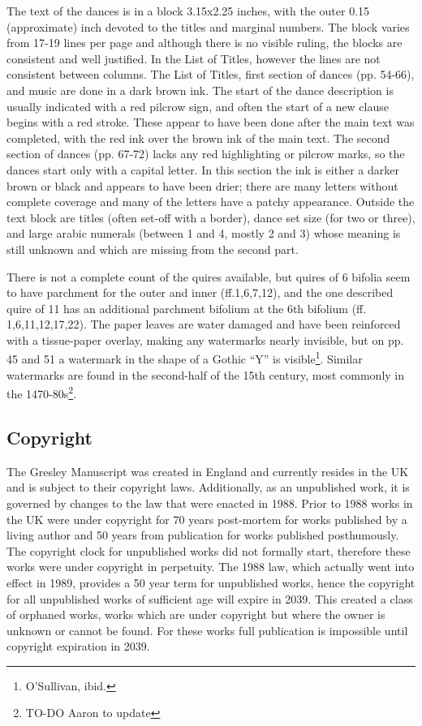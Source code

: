 \documentclass[12pt,letter]{article} %
\begin{document}
The text of the dances is in a block 3.15x2.25 inches, with the outer 0.15 (approximate) inch devoted to the titles and marginal numbers.  The block varies from 17-19 lines per page and although there is no visible ruling, the blocks are consistent and well justified.  In the List of Titles, however the lines are not consistent between columns.   The List of Titles, first section of dances (pp. 54-66), and music are done in a dark brown ink.  The start of the dance description is usually indicated with a red pilcrow sign, and often the start of a new clause begins with a red stroke.  These appear to have been done after the main text was completed, with the red ink over the brown ink of the main text. The second section of dances (pp. 67-72) lacks any red highlighting or pilcrow marks, so the dances start only with a capital letter.  In this section the ink is either a darker brown or black and appears to have been drier; there are many letters without complete coverage and many of the letters have a patchy appearance.  Outside the text block are titles (often set-off with a border), dance set size (for two or three), and large arabic numerals (between 1 and 4, mostly 2 and 3) whose meaning is still unknown and which are missing from the second part.   

There is not a complete count of the quires available, but quires of 6 bifolia seem to have parchment for the outer and inner (ff.1,6,7,12), and the one described quire of 11 has an additional parchment bifolium at the 6th bifolium (ff. 1,6,11,12,17,22).  The paper leaves are water damaged and have been reinforced with a tissue-paper overlay, making any watermarks nearly invisible, but on pp. 45 and 51 a watermark in the shape of a Gothic “Y” is visible\footnote{O’Sullivan, ibid.}.  Similar watermarks are found in the second-half of the 15th century, most commonly in the 1470-80s\footnote{TO-DO Aaron to update}.  

\subsection{Copyright}
The Gresley Manuscript was created in England and currently resides in the UK and is subject to their copyright laws.  Additionally, as an unpublished work, it is governed by changes to the law that were enacted in 1988.  Prior to 1988 works in the UK were under copyright for 70 years post-mortem for works published by a living author and 50 years from publication for works published posthumously.  The copyright clock for unpublished works did not formally start, therefore these works were under copyright in perpetuity.  The 1988 law, which actually went into effect in 1989, provides a 50 year term for unpublished works, hence the copyright for all unpublished works of sufficient age will expire in 2039.  This created a class of orphaned works, works which are under copyright but where the owner is unknown or cannot be found.  For these works full publication is impossible until copyright expiration in 2039.
\end{document}

